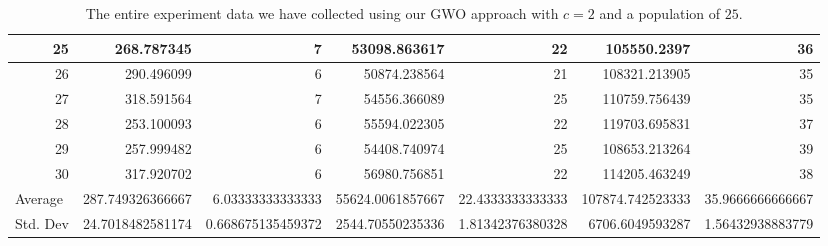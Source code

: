 \begin{table}
\begin{adjustwidth}{}{}
{{\begin{tabular}{|r|r|r|r|r|r|r|}
\hline
25                                         & 268.787345                   & 7                                     & 53098.863617                   & 22                                    & 105550.2397                  & 36                                     \\ 
\hline
26                                         & 290.496099                   & 6                                     & 50874.238564                   & 21                                    & 108321.213905                & 35                                     \\ 
\hline
27                                         & 318.591564                   & 7                                     & 54556.366089                   & 25                                    & 110759.756439                & 35                                     \\ 
\hline
28                                         & 253.100093                   & 6                                     & 55594.022305                   & 22                                    & 119703.695831                & 37                                     \\ 
\hline
29                                         & 257.999482                   & 6                                     & 54408.740974                   & 25                                    & 108653.213264                & 39                                     \\ 
\hline
30                                         & 317.920702                   & 6                                     & 56980.756851                   & 22                                    & 114205.463249                & 38                                     \\ 
\hline
\multicolumn{1}{|l|}{Average}              & 287.749326366667             & 6.03333333333333                      & 55624.0061857667               & 22.4333333333333                      & 107874.742523333             & 35.9666666666667                       \\ 
\hline
\multicolumn{1}{|l|}{Std. Dev}             & 24.7018482581174             & 0.668675135459372                     & 2544.70550235336               & 1.81342376380328                      & 6706.6049593287              & 1.56432938883779                       \\
\hline
\end{tabular}}}
\end{adjustwidth}
\caption{The entire experiment data we have collected using our GWO approach with $c = 2$ and a population of $25$.}
\label{full-data-gwo-c2-p25}
\end{table}

